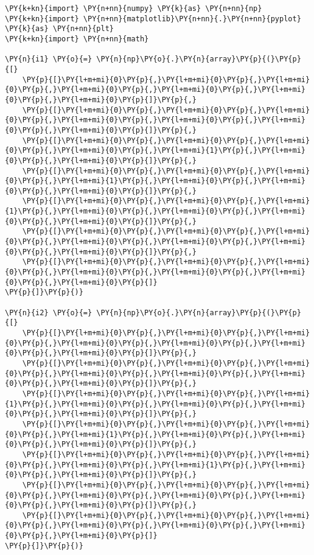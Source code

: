 \begin{tcolorbox}[breakable, size=fbox, boxrule=1pt, pad at break*=1mm,colback=cellbackground, colframe=cellborder]
\begin{Verbatim}[commandchars=\\\{\}]
\PY{k+kn}{import} \PY{n+nn}{numpy} \PY{k}{as} \PY{n+nn}{np}
\PY{k+kn}{import} \PY{n+nn}{matplotlib}\PY{n+nn}{.}\PY{n+nn}{pyplot} \PY{k}{as} \PY{n+nn}{plt}
\PY{k+kn}{import} \PY{n+nn}{math}

\PY{n}{i1} \PY{o}{=} \PY{n}{np}\PY{o}{.}\PY{n}{array}\PY{p}{(}\PY{p}{[}
    \PY{p}{[}\PY{l+m+mi}{0}\PY{p}{,}\PY{l+m+mi}{0}\PY{p}{,}\PY{l+m+mi}{0}\PY{p}{,}\PY{l+m+mi}{0}\PY{p}{,}\PY{l+m+mi}{0}\PY{p}{,}\PY{l+m+mi}{0}\PY{p}{,}\PY{l+m+mi}{0}\PY{p}{]}\PY{p}{,}
    \PY{p}{[}\PY{l+m+mi}{0}\PY{p}{,}\PY{l+m+mi}{0}\PY{p}{,}\PY{l+m+mi}{0}\PY{p}{,}\PY{l+m+mi}{0}\PY{p}{,}\PY{l+m+mi}{0}\PY{p}{,}\PY{l+m+mi}{0}\PY{p}{,}\PY{l+m+mi}{0}\PY{p}{]}\PY{p}{,}
    \PY{p}{[}\PY{l+m+mi}{0}\PY{p}{,}\PY{l+m+mi}{0}\PY{p}{,}\PY{l+m+mi}{0}\PY{p}{,}\PY{l+m+mi}{0}\PY{p}{,}\PY{l+m+mi}{1}\PY{p}{,}\PY{l+m+mi}{0}\PY{p}{,}\PY{l+m+mi}{0}\PY{p}{]}\PY{p}{,}
    \PY{p}{[}\PY{l+m+mi}{0}\PY{p}{,}\PY{l+m+mi}{0}\PY{p}{,}\PY{l+m+mi}{0}\PY{p}{,}\PY{l+m+mi}{1}\PY{p}{,}\PY{l+m+mi}{0}\PY{p}{,}\PY{l+m+mi}{0}\PY{p}{,}\PY{l+m+mi}{0}\PY{p}{]}\PY{p}{,}
    \PY{p}{[}\PY{l+m+mi}{0}\PY{p}{,}\PY{l+m+mi}{0}\PY{p}{,}\PY{l+m+mi}{1}\PY{p}{,}\PY{l+m+mi}{0}\PY{p}{,}\PY{l+m+mi}{0}\PY{p}{,}\PY{l+m+mi}{0}\PY{p}{,}\PY{l+m+mi}{0}\PY{p}{]}\PY{p}{,}
    \PY{p}{[}\PY{l+m+mi}{0}\PY{p}{,}\PY{l+m+mi}{0}\PY{p}{,}\PY{l+m+mi}{0}\PY{p}{,}\PY{l+m+mi}{0}\PY{p}{,}\PY{l+m+mi}{0}\PY{p}{,}\PY{l+m+mi}{0}\PY{p}{,}\PY{l+m+mi}{0}\PY{p}{]}\PY{p}{,}
    \PY{p}{[}\PY{l+m+mi}{0}\PY{p}{,}\PY{l+m+mi}{0}\PY{p}{,}\PY{l+m+mi}{0}\PY{p}{,}\PY{l+m+mi}{0}\PY{p}{,}\PY{l+m+mi}{0}\PY{p}{,}\PY{l+m+mi}{0}\PY{p}{,}\PY{l+m+mi}{0}\PY{p}{]}
\PY{p}{]}\PY{p}{)}

\PY{n}{i2} \PY{o}{=} \PY{n}{np}\PY{o}{.}\PY{n}{array}\PY{p}{(}\PY{p}{[}
    \PY{p}{[}\PY{l+m+mi}{0}\PY{p}{,}\PY{l+m+mi}{0}\PY{p}{,}\PY{l+m+mi}{0}\PY{p}{,}\PY{l+m+mi}{0}\PY{p}{,}\PY{l+m+mi}{0}\PY{p}{,}\PY{l+m+mi}{0}\PY{p}{,}\PY{l+m+mi}{0}\PY{p}{]}\PY{p}{,}
    \PY{p}{[}\PY{l+m+mi}{0}\PY{p}{,}\PY{l+m+mi}{0}\PY{p}{,}\PY{l+m+mi}{0}\PY{p}{,}\PY{l+m+mi}{0}\PY{p}{,}\PY{l+m+mi}{0}\PY{p}{,}\PY{l+m+mi}{0}\PY{p}{,}\PY{l+m+mi}{0}\PY{p}{]}\PY{p}{,}
    \PY{p}{[}\PY{l+m+mi}{0}\PY{p}{,}\PY{l+m+mi}{0}\PY{p}{,}\PY{l+m+mi}{1}\PY{p}{,}\PY{l+m+mi}{0}\PY{p}{,}\PY{l+m+mi}{0}\PY{p}{,}\PY{l+m+mi}{0}\PY{p}{,}\PY{l+m+mi}{0}\PY{p}{]}\PY{p}{,}
    \PY{p}{[}\PY{l+m+mi}{0}\PY{p}{,}\PY{l+m+mi}{0}\PY{p}{,}\PY{l+m+mi}{0}\PY{p}{,}\PY{l+m+mi}{1}\PY{p}{,}\PY{l+m+mi}{0}\PY{p}{,}\PY{l+m+mi}{0}\PY{p}{,}\PY{l+m+mi}{0}\PY{p}{]}\PY{p}{,}
    \PY{p}{[}\PY{l+m+mi}{0}\PY{p}{,}\PY{l+m+mi}{0}\PY{p}{,}\PY{l+m+mi}{0}\PY{p}{,}\PY{l+m+mi}{0}\PY{p}{,}\PY{l+m+mi}{1}\PY{p}{,}\PY{l+m+mi}{0}\PY{p}{,}\PY{l+m+mi}{0}\PY{p}{]}\PY{p}{,}
    \PY{p}{[}\PY{l+m+mi}{0}\PY{p}{,}\PY{l+m+mi}{0}\PY{p}{,}\PY{l+m+mi}{0}\PY{p}{,}\PY{l+m+mi}{0}\PY{p}{,}\PY{l+m+mi}{0}\PY{p}{,}\PY{l+m+mi}{0}\PY{p}{,}\PY{l+m+mi}{0}\PY{p}{]}\PY{p}{,}
    \PY{p}{[}\PY{l+m+mi}{0}\PY{p}{,}\PY{l+m+mi}{0}\PY{p}{,}\PY{l+m+mi}{0}\PY{p}{,}\PY{l+m+mi}{0}\PY{p}{,}\PY{l+m+mi}{0}\PY{p}{,}\PY{l+m+mi}{0}\PY{p}{,}\PY{l+m+mi}{0}\PY{p}{]}
\PY{p}{]}\PY{p}{)}


\end{Verbatim}
\end{tcolorbox}
